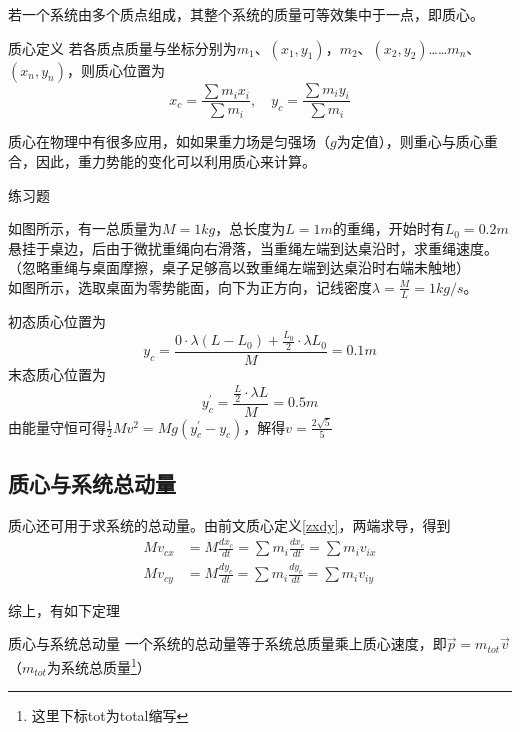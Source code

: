 若一个系统由多个质点组成，其整个系统的质量可等效集中于一点，即质心。

\begin{defi}[label=zxdy]{质心定义}{}
若各质点质量与坐标分别为$m_1$、$(x_1,y_1)$，$m_2$、$(x_2,y_2)$……$m_n$、$(x_n,y_n)$，则质心位置为
$$x_c = \frac{\sum m_i x_i}{\sum m_i} ,\quad y_c = \frac{\sum m_i y_i}{\sum m_i}$$
\end{defi}

质心在物理中有很多应用，如如果重力场是匀强场（$g$为定值），则重心与质心重合，因此，重力势能的变化可以利用质心来计算。

\begin{ep}{练习题}{}

如图所示，有一总质量为$M=1kg$，总长度为$L=1m$的重绳，开始时有$L_0 = 0.2m$悬挂于桌边，后由于微扰重绳向右滑落，当重绳左端到达桌沿时，求重绳速度。（忽略重绳与桌面摩擦，桌子足够高以致重绳左端到达桌沿时右端未触地）
~\\

如图所示，选取桌面为零势能面，向下为正方向，记线密度$\lambda = \frac{M}{L} = 1kg/s$。

\begin{minipage}[b]{0.65\linewidth}
初态质心位置为
$$y_c = \frac{ 0 \cdot \lambda (L - L_0) + \frac{L_0}{2} \cdot \lambda L_0}{M}  = 0.1m$$
末态质心位置为
$$y_c^{\prime} = \frac{\frac{L}{2} \cdot \lambda L}{M} = 0.5m$$
由能量守恒可得$\frac{1}{2} M v^2 = Mg(y_c^{\prime}-y_c)$，解得$v = \frac{2\sqrt{5}}{5}$
\end{minipage}
\hfill
\begin{minipage}[b]{0.35\linewidth}

\end{minipage}
\end{ep}

\subsection{质心与系统总动量}
质心还可用于求系统的总动量。由前文质心定义\eqref{zxdy}，两端求导，得到
\begin{subequations}
\begin{align*}
M v_{cx} &= M \frac{d x_c}{dt} = \sum m_i \frac{d x_c}{dt} = \sum m_i v_{ix} \\
M v_{cy} &= M \frac{d y_c}{dt} = \sum m_i \frac{d y_c}{dt} = \sum m_i v_{iy}  
\end{align*}
\end{subequations}

综上，有如下定理

\begin{theo}[label=zxyxtzdl]{质心与系统总动量}{}
一个系统的总动量等于系统总质量乘上质心速度，即$\vec{p} = m_{tot} \vec{v}$（$m_{tot}$为系统总质量\footnote{这里下标tot为total缩写}）
\end{theo}

